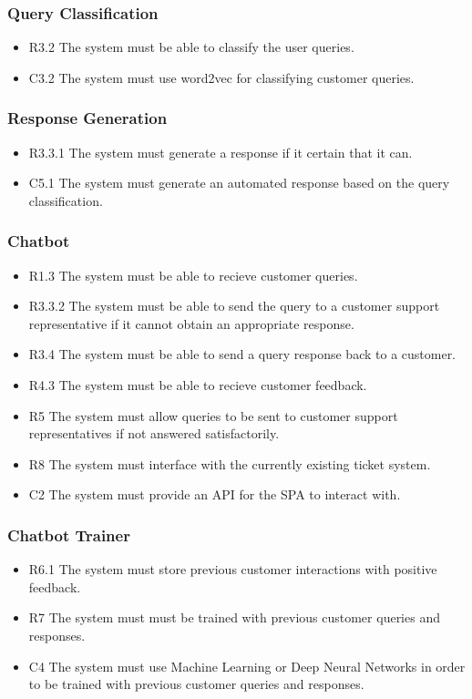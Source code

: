 \documentclass[11pt]{article}
\begin{document}
\subsubsection{Query Classification}
\begin{itemize}
  \item[] R3.2 The system must be able to classify the user queries.
  \item[] C3.2 The system must use word2vec for classifying customer queries.
\end{itemize}

\subsubsection{Response Generation}
\begin{itemize}
  \item[] R3.3.1 The system must generate a response if it certain that it can.
  \item[] C5.1 The system must generate an automated response based on the query classification.
\end{itemize}

\subsubsection{Chatbot}
\begin{itemize}
  \item[] R1.3 The system must be able to recieve customer queries.
  \item[] R3.3.2 The system must be able to send the query to a customer support representative if it cannot obtain an appropriate response.
  \item[] R3.4 The system must be able to send a query response back to a customer.
  \item[] R4.3 The system must be able to recieve customer feedback.
  \item[] R5 The system must allow queries to be sent to customer support representatives if not answered satisfactorily.
  \item[] R8 The system must interface with the currently existing ticket system.
  \item[] C2 The system must provide an API for the SPA to interact with.
\end{itemize}

\subsubsection{Chatbot Trainer}
\begin{itemize}
  \item[] R6.1 The system must store previous customer interactions with positive feedback.
  \item[] R7 The system must must be trained with previous customer queries and responses.
  \item[] C4 The system must use Machine Learning or Deep Neural Networks in order to be trained with previous customer queries and responses.
\end{itemize}
\end{document}
